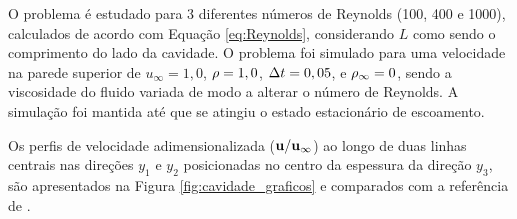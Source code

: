 O problema é estudado para 3 diferentes números de Reynolds (100, 400 e 1000), calculados de acordo com Equação \eqref{eq:Reynolds}, considerando $L$ como sendo o comprimento do lado da cavidade. O problema foi simulado para uma velocidade na parede superior de $u_{\infty} = 1,0$, $\rho = 1,0$, $\Delta t = 0,05$, e $\rho_\infty = 0$, sendo a viscosidade do fluido variada de modo a alterar o número de Reynolds. A simulação foi mantida até que se atingiu o estado estacionário de escoamento. 

Os perfis de velocidade adimensionalizada ($\mathbf{u}/\mathbf{u}_{\infty}$) ao longo de duas linhas centrais nas direções $y_1$ e $y_2$ posicionadas no centro da espessura da direção $y_3$, são apresentados na Figura \ref{fig:cavidade_graficos} e comparados com a referência de .

